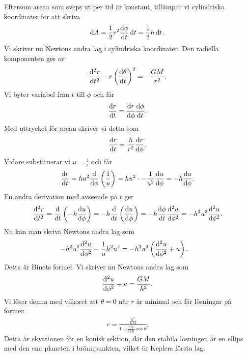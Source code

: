 Eftersom arean som sveps ut per tid är konstant, tillämpar vi cylindriska koordinater för att skriva
\begin{align*}
	\dd{A} = \frac{1}{2}r^2\dv{\phi}{t}\dd{t} = \frac{1}{2}h\dd{t}.
\end{align*}
Vi skriver nu Newtons andra lag i cylindriska koordinater. Den radiella komponenten ges av
\begin{align*}
	\dv[2]{r}{t} - r\left(\dv{\theta}{t}\right)^2 = -\frac{GM}{r^2}.
\end{align*}
Vi byter variabel från $t$ till $\phi$ och får
\begin{align*}
	\dv{r}{t} = \dv{r}{\phi}\dv{\phi}{t}.
\end{align*}
Med uttrycket för arean skriver vi detta som
\begin{align*}
	\dv{r}{t} = \frac{h}{r^2}\dv{r}{\phi}.
\end{align*}
Vidare substituerar vi $u = \frac{1}{r}$ och får
\begin{align*}
	\dv{r}{t} = hu^2\dv{\phi}\left(\frac{1}{u}\right) = hu^2\cdot -\frac{1}{u^2}\dv{u}{\phi} = -h\dv{u}{\phi}.
\end{align*}
En andra derivation med avseende på $t$ ger
\begin{align*}
	\dv[2]{r}{t} = \dv{t}\left(-h\dv{u}{\phi}\right) = -h\dv{t}\left(\dv{u}{\phi}\right) = -h\dv{\phi}{t}\dv[2]{u}{\phi} = -h^2u^2\dv[2]{u}{\phi}.
\end{align*}
Nu kan man skriva Newtons andra lag som
\begin{align*}
	-h^2u^2\dv[2]{u}{\phi} - \frac{1}{u}h^2u^4 &= -h^2u^2\left(\dv[2]{u}{\phi} + u\right).
\end{align*}
Detta är Binets formel. Vi skriver nu Newtons andra lag som
\begin{align*}
	\dv[2]{u}{\phi} + u = \frac{GM}{h^2}.
\end{align*}
Vi löser denna med vilkoret att $\theta = 0$ när $r$ är minimal och får lösningar på formen
\begin{align*}
	r = \frac{\frac{h^2}{GM}}{1 + \frac{h^2C}{GM}\cos{\theta}}.
\end{align*}
Detta är ekvationen för en konisk sektion, där den stabila lösningen är en ellips med den ena planeten i brännpunkten, vilket är Keplers första lag.

